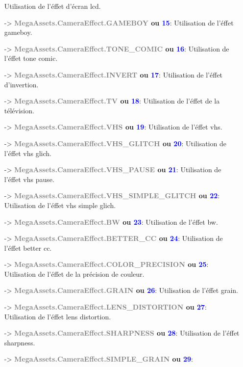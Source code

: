 \documentclass[a4paper, 11pt]{article}
\begin{document}
\begin{itemize}
		Utilisation de l'éffet d'écran lcd.
		\item [-> \textbf{\textcolor{gray}{MegaAssets.CameraEffect.GAMEBOY} ou \textcolor{blue}{15}}:] 
		Utilisation de l'éffet gameboy.
		\item [-> \textbf{\textcolor{gray}{MegaAssets.CameraEffect.TONE\_COMIC} ou \textcolor{blue}{16}}:] 
		Utilisation de l'éffet tone comic.
		\item [-> \textbf{\textcolor{gray}{MegaAssets.CameraEffect.INVERT} ou \textcolor{blue}{17}}:] 
		Utilisation de l'éffet d'invertion.
		\item [-> \textbf{\textcolor{gray}{MegaAssets.CameraEffect.TV} ou \textcolor{blue}{18}}:] 
		Utilisation de l'éffet de la télévision.
		\item [-> \textbf{\textcolor{gray}{MegaAssets.CameraEffect.VHS} ou \textcolor{blue}{19}}:] 
		Utilisation de l'éffet vhs.
		\item [-> \textbf{\textcolor{gray}{MegaAssets.CameraEffect.VHS\_GLITCH} ou \textcolor{blue}{20}}:] 
		Utilisation de l'éffet vhs glich.
		\item [-> \textbf{\textcolor{gray}{MegaAssets.CameraEffect.VHS\_PAUSE} ou \textcolor{blue}{21}}:] 
		Utilisation de l'éffet vhs pause.
		\item [-> \textbf{\textcolor{gray}{MegaAssets.CameraEffect.VHS\_SIMPLE\_GLITCH} ou \textcolor{blue}
		{22}}:] Utilisation de l'éffet vhs simple glich.
		\item [-> \textbf{\textcolor{gray}{MegaAssets.CameraEffect.BW} ou \textcolor{blue}{23}}:] 
		Utilisation de l'éffet bw.
		\item [-> \textbf{\textcolor{gray}{MegaAssets.CameraEffect.BETTER\_CC} ou \textcolor{blue}{24}}:] 
		Utilisation de l'éffet better cc.
		\item [-> \textbf{\textcolor{gray}{MegaAssets.CameraEffect.COLOR\_PRECISION} ou \textcolor{blue}
		{25}}:] Utilisation de l'éffet de la précision de couleur.
		\item [-> \textbf{\textcolor{gray}{MegaAssets.CameraEffect.GRAIN} ou \textcolor{blue}{26}}:] 
		Utilisation de l'éffet grain.
		\item [-> \textbf{\textcolor{gray}{MegaAssets.CameraEffect.LENS\_DISTORTION} ou \textcolor{blue}
		{27}}:] Utilisation de l'éffet lens distortion.
		\item [-> \textbf{\textcolor{gray}{MegaAssets.CameraEffect.SHARPNESS} ou \textcolor{blue}{28}}:] 
		Utilisation de l'éffet sharpness.
		\item [-> \textbf{\textcolor{gray}{MegaAssets.CameraEffect.SIMPLE\_GRAIN} ou \textcolor{blue}{29}}:] 

\end{itemize}
\end{document}
